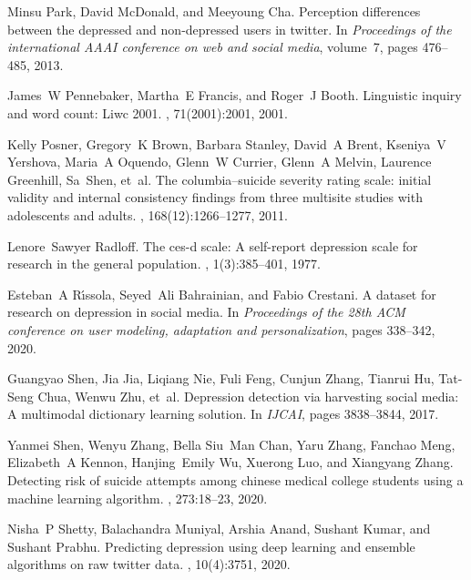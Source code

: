 \begin{thebibliography}{10}
Minsu Park, David McDonald, and Meeyoung Cha.
\newblock Perception differences between the depressed and non-depressed users
  in twitter.
\newblock In {\em Proceedings of the international AAAI conference on web and
  social media}, volume~7, pages 476--485, 2013.

James~W Pennebaker, Martha~E Francis, and Roger~J Booth.
\newblock Linguistic inquiry and word count: Liwc 2001.
, 71(2001):2001, 2001.

Kelly Posner, Gregory~K Brown, Barbara Stanley, David~A Brent, Kseniya~V
  Yershova, Maria~A Oquendo, Glenn~W Currier, Glenn~A Melvin, Laurence
  Greenhill, Sa~Shen, et~al.
\newblock The columbia--suicide severity rating scale: initial validity and
  internal consistency findings from three multisite studies with adolescents
  and adults.
, 168(12):1266--1277, 2011.

Lenore~Sawyer Radloff.
\newblock The ces-d scale: A self-report depression scale for research in the
  general population.
, 1(3):385--401, 1977.

Esteban~A R{\'\i}ssola, Seyed~Ali Bahrainian, and Fabio Crestani.
\newblock A dataset for research on depression in social media.
\newblock In {\em Proceedings of the 28th ACM conference on user modeling,
  adaptation and personalization}, pages 338--342, 2020.

Guangyao Shen, Jia Jia, Liqiang Nie, Fuli Feng, Cunjun Zhang, Tianrui Hu,
  Tat-Seng Chua, Wenwu Zhu, et~al.
\newblock Depression detection via harvesting social media: A multimodal
  dictionary learning solution.
\newblock In {\em IJCAI}, pages 3838--3844, 2017.

Yanmei Shen, Wenyu Zhang, Bella Siu~Man Chan, Yaru Zhang, Fanchao Meng,
  Elizabeth~A Kennon, Hanjing~Emily Wu, Xuerong Luo, and Xiangyang Zhang.
\newblock Detecting risk of suicide attempts among chinese medical college
  students using a machine learning algorithm.
, 273:18--23, 2020.

Nisha~P Shetty, Balachandra Muniyal, Arshia Anand, Sushant Kumar, and Sushant
  Prabhu.
\newblock Predicting depression using deep learning and ensemble algorithms on
  raw twitter data.
,
  10(4):3751, 2020.


\end{thebibliography}
